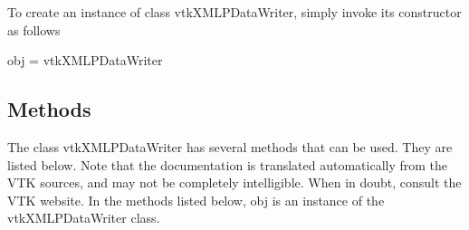 To create an instance of class vtk\-X\-M\-L\-P\-Data\-Writer, simply invoke its constructor as follows \begin{DoxyVerb}  obj = vtkXMLPDataWriter
\end{DoxyVerb}
 \hypertarget{vtkwidgets_vtkxyplotwidget_Methods}{}\subsection{Methods}\label{vtkwidgets_vtkxyplotwidget_Methods}
The class vtk\-X\-M\-L\-P\-Data\-Writer has several methods that can be used. They are listed below. Note that the documentation is translated automatically from the V\-T\-K sources, and may not be completely intelligible. When in doubt, consult the V\-T\-K website. In the methods listed below, {\ttfamily obj} is an instance of the vtk\-X\-M\-L\-P\-Data\-Writer class. 
